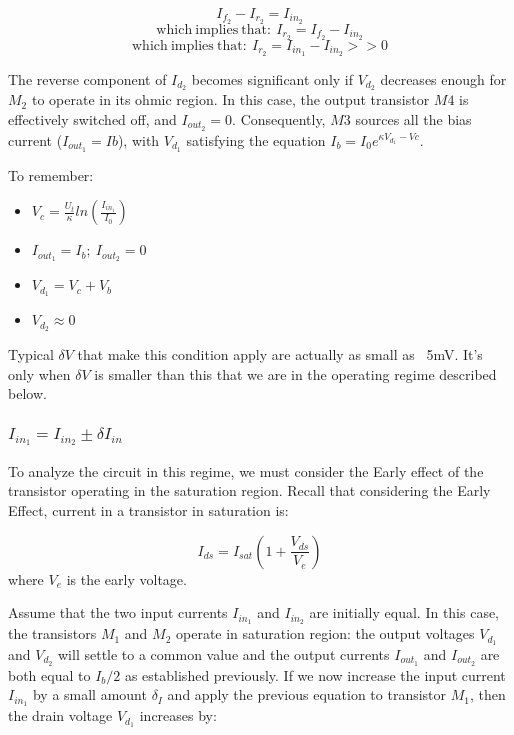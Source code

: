\begin{equation}
    I_{f_2} - I_{r_2} = I_{in_2}
\end{equation}
\begin{equation}
    \mathrm{which \ implies \ that: \ }I_{r_2} = I_{f_2} - I_{in_2}
\end{equation}
\begin{equation}
    \mathrm{which \ implies \ that: \ }I_{r_2} = I_{in_1} - I_{in_2} >> 0
\end{equation}

The reverse component of $I_{d_2}$ becomes significant only if $V_{d_2}$ decreases
enough for $M_2$ to operate in its ohmic region. In this case, the output transistor $M4$ is effectively switched off, and $I_{out_2} = 0$. Consequently,
$M3$ sources all the bias current ($I_{out_1} = Ib$), with $V_{d_1}$ satisfying the equation $I_b = I_0e^{\kappa V_{d_1} - Vc}$. 

To remember: 

\begin{itemize}
    \item $V_c = \frac{U_t}{\kappa}ln(\frac{I_{in_1}}{I_0})$
    \item $I_{out_1} = I_b; \ I_{out_2} = 0$
    \item $V_{d_1} = V_c + V_b$
    \item $V_{d_2} \approx 0$
\end{itemize}

Typical $\delta V$ that make this condition apply are actually as small as ~5mV. It's only when $\delta V$ is smaller than this that we are in the operating regime described below.  

\subsubsection{$I_{in_1} = I_{in_2} \pm \delta I_{in}$}

To analyze the circuit in this regime, we must consider the Early effect of the transistor operating in the saturation region. Recall that considering the Early Effect, current in a transistor in saturation is: 

\begin{equation}
    I_{ds} = I_{sat}(1 + \frac{V_{ds}}{V_e})
\end{equation}
where $V_e$ is the early voltage. 

Assume that the two input currents $I_{in_1}$ and $I_{in_2}$ are initially equal. In this case, the transistors $M_1$ and $M_2$ operate in saturation region: the output voltages $V_{d_1}$ and $V_{d_2}$ will settle to a common value and the output currents $I_{out_1}$ and $I_{out_2}$ are both equal to $I_b/2$ as established previously. If we now increase the input current $I_{in_1}$ by a small amount $\delta_I$ and apply the previous equation to transistor $M_1$, then the drain voltage $V_{d_1}$ increases by: 

